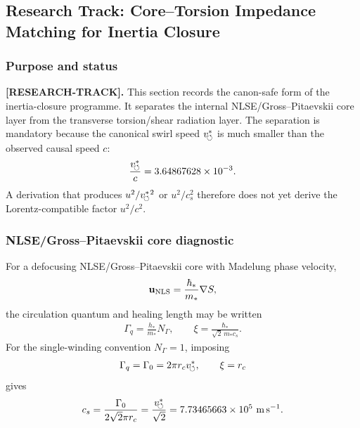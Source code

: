 

\subsection{Research Track: Core--Torsion Impedance Matching for Inertia Closure}
\label{sec:rt_core_torsion_impedance_matching}

\subsubsection{Purpose and status}

\textbf{[RESEARCH-TRACK].}
This section records the canon-safe form of the inertia-closure programme. It separates the internal NLSE/Gross--Pitaevskii core layer from the transverse torsion/shear radiation layer. The separation is mandatory because the canonical swirl speed \(v_{\!\boldsymbol{\circlearrowleft}}^{\ast}\) is much smaller than the observed causal speed \(c\):
\begin{align}
    \frac{v_{\!\boldsymbol{\circlearrowleft}}^{\ast}}{c}=3.64867628\times10^{-3}.
\end{align}
A derivation that produces \(u^2/v_{\!\boldsymbol{\circlearrowleft}}^{\ast}{}^2\) or \(u^2/c_s^2\) therefore does not yet derive the Lorentz-compatible factor \(u^2/c^2\).

\subsubsection{NLSE/Gross--Pitaevskii core diagnostic}

For a defocusing NLSE/Gross--Pitaevskii core with Madelung phase velocity,
\begin{align}
    \mathbf u_{\rm NLS}=\frac{\hbar_*}{m_*}\nabla S,
\end{align}
the circulation quantum and healing length may be written
\begin{align}
    \Gamma_q = \frac{h_*}{m_*}N_\Gamma,
    \qquad
    \xi = \frac{\hbar_*}{\sqrt{2}\,m_*c_s}.
\end{align}
For the single-winding convention \(N_\Gamma=1\), imposing
\begin{align}
    \Gamma_q=\Gamma_0=2\pi r_cv_{\!\boldsymbol{\circlearrowleft}}^{\ast},
    \qquad
    \xi=r_c
\end{align}
gives
\begin{align}
    c_s
    =
    \frac{\Gamma_0}{2\sqrt{2}\pi r_c}
    =
    \frac{v_{\!\boldsymbol{\circlearrowleft}}^{\ast}}{\sqrt{2}}
    =
    7.73465663\times10^{5}\ \mathrm{m\,s^{-1}}.
    \label{eq:rt_core_torsion_cs}
\end{align}

